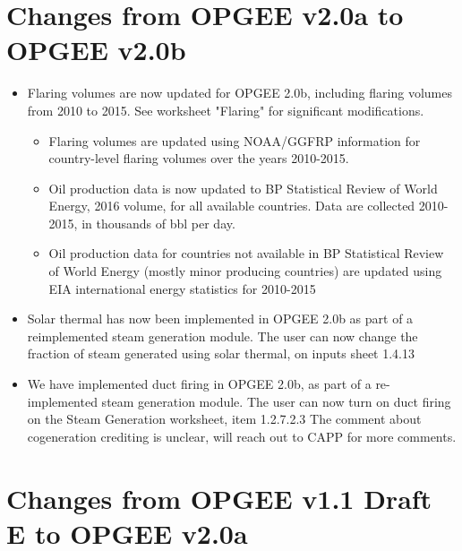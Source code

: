 \documentclass[11pt]{report}
\begin{document}
\section{Changes from OPGEE v2.0a to OPGEE v2.0b}

\begin{itemize}
\item Flaring volumes are now updated for OPGEE 2.0b, including flaring volumes from 2010 to 2015. See worksheet "Flaring" for significant modifications.
	\begin{itemize}
	\item Flaring volumes are updated using NOAA/GGFRP information for country-level flaring volumes over the years 2010-2015.
	\item Oil production data is now updated to BP Statistical Review of World Energy, 2016 volume, for all available countries. Data are collected 2010-2015, in thousands of bbl per day.
	\item Oil production data for countries not available in BP Statistical Review of World Energy (mostly minor producing countries) are updated using EIA international energy statistics for 2010-2015
	\end{itemize}
\item Solar thermal has now been implemented in OPGEE 2.0b as part of a reimplemented steam generation module. The user can now change the fraction of steam generated using solar thermal, on inputs sheet 1.4.13

\item We have implemented duct firing in OPGEE 2.0b, as part of a re-implemented steam generation module. The user can now turn on duct firing on the Steam Generation worksheet, item 1.2.7.2.3
The comment about cogeneration crediting is unclear, will reach out to CAPP for more comments.
\end{itemize}




\section{Changes from OPGEE v1.1 Draft E to OPGEE v2.0a}
\end{document}
